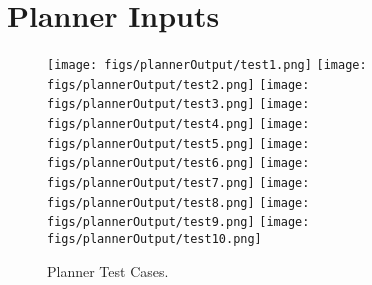 
\section{Planner Inputs}
\label{app:planner_inputs}


\begin{figure}[ht!]
 \centering
 \texttt{[image: figs/plannerOutput/test1.png]}
 \texttt{[image: figs/plannerOutput/test2.png]}
 \texttt{[image: figs/plannerOutput/test3.png]}
 \texttt{[image: figs/plannerOutput/test4.png]}
 \texttt{[image: figs/plannerOutput/test5.png]}
 \texttt{[image: figs/plannerOutput/test6.png]}
 \texttt{[image: figs/plannerOutput/test7.png]}
 \texttt{[image: figs/plannerOutput/test8.png]}
 \texttt{[image: figs/plannerOutput/test9.png]}
 \texttt{[image: figs/plannerOutput/test10.png]}
 \caption{Planner Test Cases.}
 \label{fig:planner_tests}
\end{figure}

